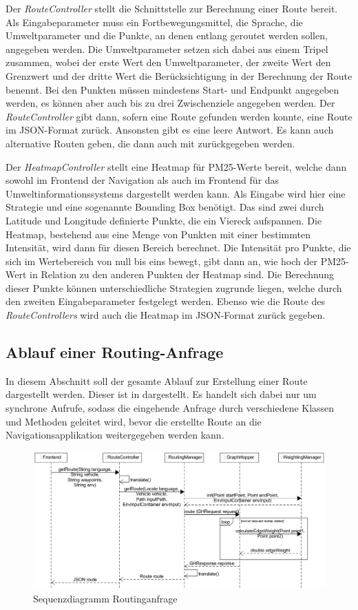 Der \textit{RouteController} stellt die Schnittstelle zur Berechnung einer Route bereit. Als Eingabeparameter muss ein Fortbewegungsmittel, die Sprache, die Umweltparameter und die Punkte, an denen entlang geroutet werden sollen, angegeben werden. Die Umweltparameter setzen sich dabei aus einem Tripel zusammen, wobei der erste Wert den Umweltparameter, der zweite Wert den Grenzwert und der dritte Wert die Berücksichtigung in der Berechnung der Route benennt. Bei den Punkten müssen mindestens Start- und Endpunkt angegeben werden, es können aber auch bis zu drei Zwischenziele angegeben werden. Der \textit{RouteController} gibt dann, sofern eine Route gefunden werden konnte, eine Route im JSON-Format zurück. Ansonsten gibt es eine leere Antwort. Es kann auch alternative Routen geben, die dann auch mit zurückgegeben werden.

Der \textit{HeatmapController} stellt eine Heatmap für PM25-Werte bereit, welche dann sowohl im Frontend der Navigation als auch im Frontend für das Umweltinformationssystems dargestellt werden kann. Als Eingabe wird hier eine Strategie und eine sogenannte Bounding Box benötigt. Das sind zwei durch Latitude und Longitude definierte Punkte, die ein Viereck aufspannen. Die Heatmap, bestehend aus eine Menge von Punkten mit einer bestimmten Intensität, wird dann für diesen Bereich berechnet. Die Intensität pro Punkte, die sich im Wertebereich von null bis eins bewegt, gibt dann an, wie hoch der PM25-Wert in Relation zu den anderen Punkten der Heatmap sind. Die Berechnung dieser Punkte können unterschiedliche Strategien zugrunde liegen, welche durch den zweiten Eingabeparameter festgelegt werden. Ebenso wie die Route des \textit{RouteControllers} wird auch die Heatmap im JSON-Format zurück gegeben.

\subsection{Ablauf einer Routing-Anfrage}
In diesem Abschnitt soll der gesamte Ablauf zur Erstellung einer Route dargestellt werden. Dieser ist in  dargestellt. Es handelt sich dabei nur um synchrone Aufrufe, sodass die eingehende Anfrage durch verschiedene Klassen und Methoden geleitet wird, bevor die erstellte Route an die Navigationsapplikation weitergegeben werden kann.

\begin{figure}[htb]
	\centering
	\includegraphics[width=\textwidth]{./ressourcen/routing/sdAbfrage.png}
	\caption{Sequenzdiagramm Routinganfrage}
	\label{fig:Routinganfrage_Sequenzdiagramm}
\end{figure}

